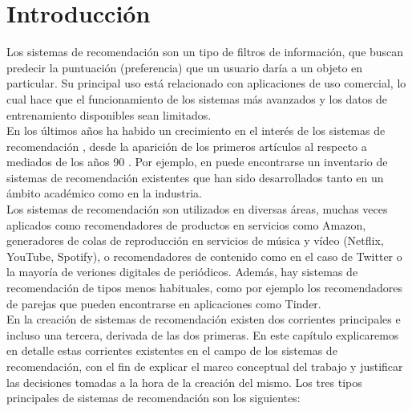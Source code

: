 \section{Introducción}

Los sistemas de recomendación son un tipo de filtros de información, que buscan predecir la puntuación (preferencia) que un usuario daría a un objeto en particular. Su principal uso está relacionado con aplicaciones de uso comercial, lo cual hace que el funcionamiento de los sistemas más avanzados y los datos de entrenamiento disponibles sean limitados.\\

En los últimos años ha habido un crecimiento en el interés de los sistemas de recomendación \cite{Abdomavicius}, desde la aparición de los primeros artículos al respecto a mediados de los años 90 \cite{resnick}. Por ejemplo, en \cite{nageswara} puede encontrarse un inventario de sistemas de recomendación existentes que han sido desarrollados tanto en un ámbito académico como en la industria.\\

Los sistemas de recomendación son utilizados en diversas áreas, muchas veces aplicados como recomendadores de productos en servicios como Amazon, generadores de colas de reproducción en servicios de música y vídeo (Netflix, YouTube, Spotify), o recomendadores de contenido como en el caso de Twitter o la mayoría de veriones digitales de periódicos. Además, hay sistemas de recomendación de tipos menos habituales, como por ejemplo los recomendadores de parejas que pueden encontrarse en aplicaciones como Tinder.\\

En la creación de sistemas de recomendación existen dos corrientes principales e incluso una tercera, derivada de las dos primeras. En este capítulo explicaremos en detalle estas corrientes existentes en el campo de los sistemas de recomendación, con el fin de explicar el marco conceptual del trabajo y justificar las decisiones tomadas a la hora de la creación del mismo. Los tres tipos principales de sistemas de recomendación son los siguientes:

